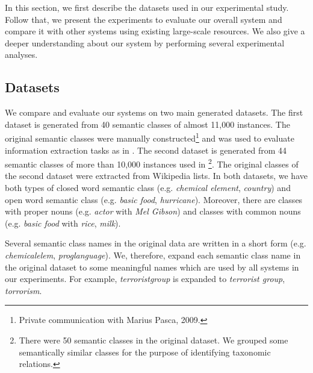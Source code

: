 In this section, we first describe the datasets used in our
experimental study. Follow that, we present the experiments to
evaluate our overall system and compare it with other systems using
existing large-scale resources. We also give a deeper understanding
about our system by performing several experimental analyses.

\subsection{Datasets}
\label{sec:dataset}

We compare and evaluate our systems on two main generated datasets.
The first dataset is generated from 40 semantic classes of almost
11,000 instances. The original semantic classes were manually
constructed\footnote{Private communication with Marius Pasca, 2009.}
and was used to evaluate information extraction tasks as in
\cite{citeulike:1587018,pacsca-vandurme:2008:ACLMain}. The second
dataset is generated from 44 semantic classes of more than 10,000
instances used in \cite{vyas-pantel:2009:NAACLHLT09}\footnote{There
  were 50 semantic classes in the original dataset. We grouped some
  semantically similar classes for the purpose of identifying
  taxonomic relations.}. The original classes of the second dataset
were extracted from Wikipedia lists. In both datasets, we have both
types of closed word semantic class (e.g. {\em chemical element}, {\em
  country}) and open word semantic class (e.g. {\em basic food}, {\em
  hurricane}). Moreover, there are classes with proper nouns
(e.g. {\em actor} with {\em Mel Gibson}) and classes with common nouns
(e.g. {\em basic food} with {\em rice}, {\em milk}).

Several semantic class names in the original data are written in a
short form (e.g. {\em chemicalelem}, {\em proglanguage}). We,
therefore, expand each semantic class name in the original dataset to
some meaningful names which are used by all systems in our
experiments. For example, {\em terroristgroup} is expanded to {{\em
    terrorist group}, {\em torrorism}}.

